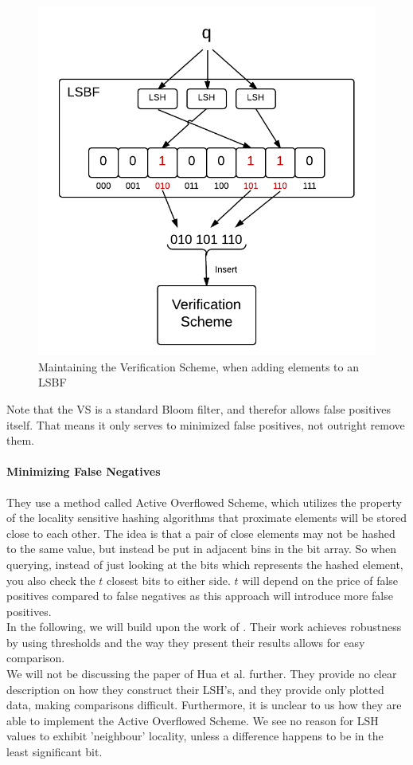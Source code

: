 \documentclass[a4paper,11pt]{article}
\begin{document}
\begin{figure}[H]
\centering
\includegraphics[width=.5\linewidth]{verification_scheme}
\caption{Maintaining the Verification Scheme, when adding elements to an LSBF}
\label{fig:verification_scheme}
\end{figure}


Note that the VS is a standard Bloom filter, and therefor allows false positives itself. That means it only serves to minimized false positives, not outright remove them.

\paragraph{Minimizing False Negatives}
They use a method called Active Overflowed Scheme, which utilizes the property of the locality sensitive hashing algorithms that proximate elements will be stored close to each other. The idea is that a pair of close elements may not be hashed to the same value, but instead be put in adjacent bins in the bit array. So when querying, instead of just looking at the bits which represents the hashed element, you also check the $t$ closest bits to either side. $t$ will depend on the price of false positives compared to false negatives as this approach will introduce more false positives.\\

In the following, we will build upon the work of \cite{paper:harvard}.  Their work achieves robustness by using thresholds and the way they present their results allows for easy comparison.\\

We will not be discussing the paper of Hua et al.\cite{paper:hua} further. They provide no clear description on how they construct their LSH's, and they provide only plotted data, making comparisons difficult. Furthermore, it is unclear to us how they are able to implement the Active Overflowed Scheme. We see no reason for LSH values to exhibit 'neighbour' locality, unless a difference happens to be in the least significant bit.
\end{document}
